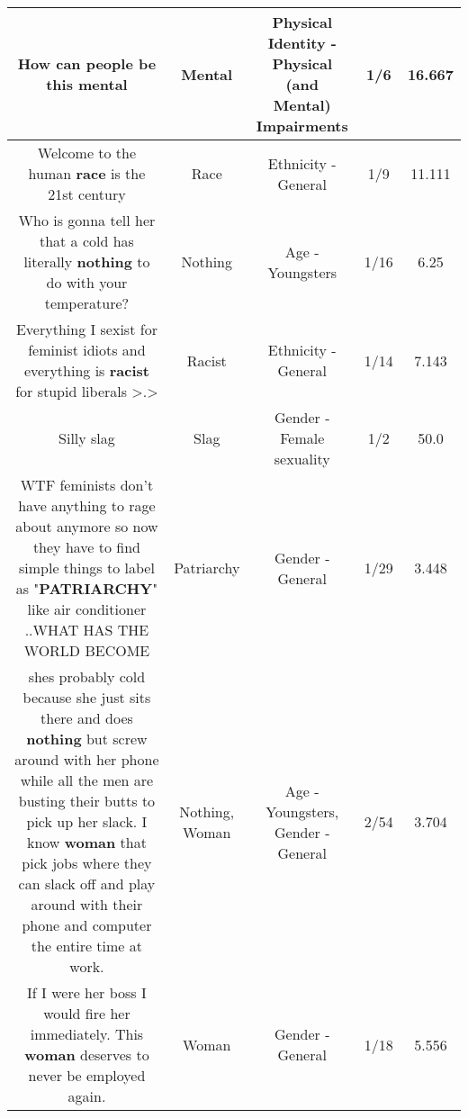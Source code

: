 \documentclass[11pt]{article}
\newlength\mylength
\begin{document}
\begin{center}
\begin{longtable}{|C{.65\mylength}|C{.30\mylength}|C{.12\mylength}|C{.12\mylength}|C{.12\mylength}|}
  \small How can people be this mental\normalsize   & Mental & Physical Identity - Physical (and Mental) Impairments & 1/6 & 16.667 \\  \hline
  \small Welcome to the human \textbf{race} is the 21st century\normalsize   & Race & Ethnicity - General & 1/9 & 11.111 \\  \hline
  \small Who is gonna tell her that a cold has literally \textbf{nothing} to do with your temperature?\normalsize   & Nothing & Age - Youngsters & 1/16 & 6.25 \\  \hline
  \small Everything I sexist for feminist idiots and everything is \textbf{racist} for stupid liberals >.>\normalsize   & Racist & Ethnicity - General & 1/14 & 7.143 \\  \hline
  \small Silly slag\normalsize   & Slag & Gender - Female sexuality & 1/2 & 50.0 \\  \hline
  \small WTF feminists don't have anything to rage about anymore so now they have to find simple things to label as "\textbf{PATRIARCHY}" like air conditioner ..WHAT HAS THE WORLD BECOME\normalsize   & Patriarchy & Gender - General & 1/29 & 3.448 \\  \hline
  \small shes probably cold because she just sits there and does \textbf{nothing} but screw around with her phone while all the men are busting their butts to pick up her slack.  I know \textbf{woman} that pick jobs where they can slack off and play around with their phone and computer the entire time at work.\normalsize   & Nothing, Woman & Age - Youngsters, Gender - General & 2/54 & 3.704 \\  \hline
  \small If I were her boss I would fire her immediately. This \textbf{woman} deserves to never be employed again.\normalsize   & Woman & Gender - General & 1/18 & 5.556 \\  \hline

\end{longtable}
\end{center}
\end{document}
